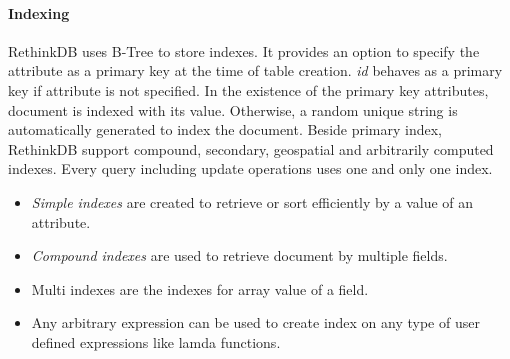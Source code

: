 \paragraph{Indexing}
	RethinkDB uses B-Tree to store indexes. It provides an option to specify the attribute as a primary key at the time of table creation. \textit{id} behaves as a primary key if attribute is not specified. In the existence of the primary key attributes, document is indexed with its value. Otherwise, a random unique string is automatically generated to index the document. 
	Beside primary index, RethinkDB support compound, secondary, geospatial  and arbitrarily computed indexes. Every query including update operations uses one and only one index\citep{rethinkdb}.
	\begin{itemize}
		\item \textit{Simple indexes} are created to retrieve or sort efficiently by a value of an attribute.
		\item \textit{Compound indexes} are used to retrieve document by multiple fields. 
		\item Multi indexes are the indexes for array value of a field. 
		\item Any arbitrary expression can be used to create index on any type of user defined expressions like lamda functions.
	\end{itemize}
	